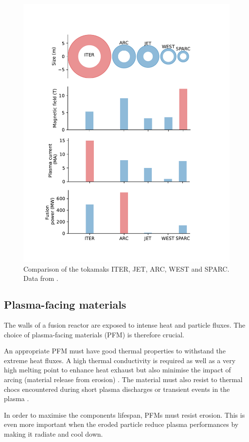 \begin{figure}
    \includegraphics[width=0.75\linewidth]{Figures/Chapter1/comparison_reactors.pdf}
    \caption{Comparison of the tokamaks ITER, JET, ARC, WEST and SPARC. Data from \cite{delaporte-mathurin_remdelaportemathurinfusion-world_2022}.}
\end{figure}

\subsection{Plasma-facing materials}

The walls of a fusion reactor are exposed to intense heat and particle fluxes.
The choice of plasma-facing materials (PFM) is therefore crucial.

An appropriate PFM must have good thermal properties to withstand the extreme heat fluxes.
A high thermal conductivity is required as well as a very high melting point to enhance heat exhaust but also minimise the impact of arcing (material release from erosion) .
The material must also resist to thermal chocs encountered during short plasma discharges or transient events in the plasma .

In order to maximise the components lifespan, PFMs must resist erosion.
This is even more important when the eroded particle reduce plasma performances by making it radiate and cool down.

